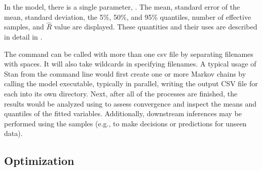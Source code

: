 In the  model, there is a single parameter,
. The mean, standard error of the mean, standard
deviation, the 5\%, 50\%, and 95\% quantiles,
number of effective samples, and $\hat{R}$ value are displayed.
These quantities and their uses are described in detail in 
.

The command  can be called with more than one csv file
by separating filenames with spaces. It will also take wildcards in
specifying filenames. A typical usage of Stan from the command line
would first create one or more Markov chains by calling the model
executable, typically in parallel, writing the output CSV file for
each into its own directory.  Next, after all of the processes are
finished, the results would be analyzed using  to assess
convergence and inspect the means and quantiles of the fitted
variables.  Additionally, downstream inferences may be performed using
the samples (e.g., to make decisions or predictions for unseen data).

\subsection{Optimization}


